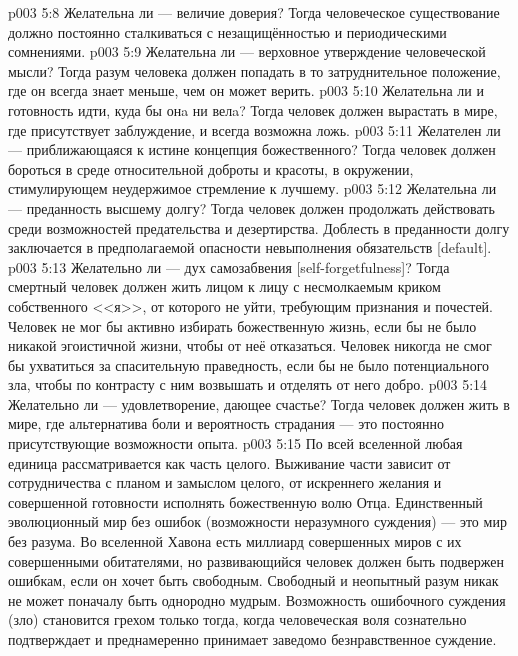 \vs p003 5:8 \bibnobreakspace Желательна ли  --- величие доверия? Тогда человеческое существование должно постоянно сталкиваться с незащищённостью и периодическими сомнениями.
\vs p003 5:9 \bibnobreakspace Желательна ли  --- верховное утверждение человеческой мысли? Тогда разум человека должен попадать в то затруднительное положение, где он всегда знает меньше, чем он может верить.
\vs p003 5:10 \bibnobreakspace Желательна ли  и готовность идти, куда бы онa ни велa? Тогда человек должен вырастать в мире, где присутствует заблуждение, и всегда возможна ложь.
\vs p003 5:11 \bibnobreakspace Желателен ли  --- приближающаяся к истине концепция божественного? Тогда человек должен бороться в среде относительной доброты и красоты, в окружении, стимулирующем неудержимое стремление к лучшему.
\vs p003 5:12 \bibnobreakspace Желательна ли  \bibemph{[loyalty]} --- преданность высшему долгу? Тогда человек должен продолжать действовать среди возможностей предательства и дезертирства. Доблесть в преданности долгу заключается в предполагаемой опасности невыполнения обязательств [default].
\vs p003 5:13 \bibnobreakspace Желательно ли  --- дух самозабвения [self\hyp{}forgetfulness]? Тогда смертный человек должен жить лицом к лицу с несмолкаемым криком собственного <<я>>, от которого не уйти, требующим признания и почестей. Человек не мог бы активно избирать божественную жизнь, если бы не было никакой эгоистичной жизни, чтобы от неё отказаться. Человек никогда не смог бы ухватиться за спасительную праведность, если бы не было потенциального зла, чтобы по контрасту с ним возвышать и отделять от него добро.
\vs p003 5:14 \bibnobreakspace Желательно ли  --- удовлетворение, дающее счастье? Тогда человек должен жить в мире, где альтернатива боли и вероятность страдания --- это постоянно присутствующие возможности опыта.
\vs p003 5:15 \pc По всей вселенной любая единица рассматривается как часть целого. Выживание части зависит от сотрудничества с планом и замыслом целого, от искреннего желания и совершенной готовности исполнять божественную волю Отца. Единственный эволюционный мир без ошибок (возможности неразумного суждения) --- это мир без  разума. Во вселенной Хавона есть миллиард совершенных миров с их совершенными обитателями, но развивающийся человек должен быть подвержен ошибкам, если он хочет быть свободным. Свободный и неопытный разум никак не может поначалу быть однородно мудрым. Возможность ошибочного суждения (зло) становится грехом только тогда, когда человеческая воля сознательно подтверждает и преднамеренно принимает заведомо безнравственное суждение.
